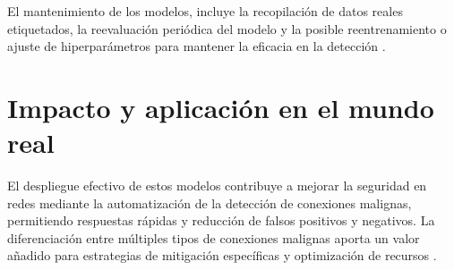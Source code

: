 El mantenimiento de los modelos, incluye la recopilación de datos reales etiquetados, la reevaluación periódica del modelo y la posible reentrenamiento o ajuste de hiperparámetros para mantener la eficacia en la detección \cite{tsymbal2004problem}.

\section{Impacto y aplicación en el mundo real}

El despliegue efectivo de estos modelos contribuye a mejorar la seguridad en redes mediante la automatización de la detección de conexiones malignas, permitiendo respuestas rápidas y reducción de falsos positivos y negativos. La diferenciación entre múltiples tipos de conexiones malignas aporta un valor añadido para estrategias de mitigación específicas y optimización de recursos \cite{amershi2019software}.

